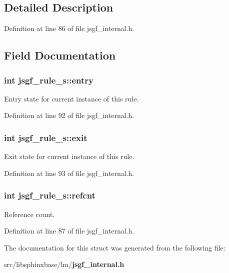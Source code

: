 \subsection{Detailed Description}


Definition at line 86 of file jsgf\-\_\-internal.\-h.



\subsection{Field Documentation}
\subsubsection[{entry}]{\setlength{\rightskip}{0pt plus 5cm}int jsgf\-\_\-rule\-\_\-s\-::entry}\label{structjsgf__rule__s_a0d54a847059e9690854a9776cb5051e4}


Entry state for current instance of this rule. 



Definition at line 92 of file jsgf\-\_\-internal.\-h.

\subsubsection[{exit}]{\setlength{\rightskip}{0pt plus 5cm}int jsgf\-\_\-rule\-\_\-s\-::exit}\label{structjsgf__rule__s_a9bdd64ed40fe86c14a2f0bf01252b069}


Exit state for current instance of this rule. 



Definition at line 93 of file jsgf\-\_\-internal.\-h.

\subsubsection[{refcnt}]{\setlength{\rightskip}{0pt plus 5cm}int jsgf\-\_\-rule\-\_\-s\-::refcnt}\label{structjsgf__rule__s_aeb4c05f6daa425a37d362e2c6de1228e}


Reference count. 



Definition at line 87 of file jsgf\-\_\-internal.\-h.



The documentation for this struct was generated from the following file\-:\begin{DoxyCompactItemize}
\item 
src/libsphinxbase/lm/{\bf jsgf\-\_\-internal.\-h}\end{DoxyCompactItemize}

